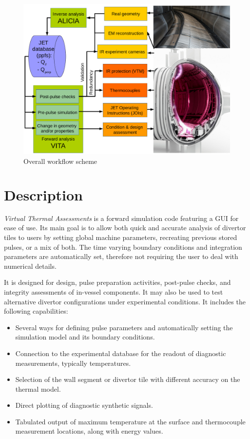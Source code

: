 \begin{figure}[htbp]
	\centering
	\includegraphics[width=0.90\linewidth]{images/scheme_software}
	\caption{Overall workflow scheme}
	\label{fig:scheme}
\end{figure}


\section{Description}
\textit{Virtual Thermal Assessments} is a forward simulation code featuring a GUI
for ease of use. Its main goal is to allow both quick and accurate analysis of divertor tiles to users by setting global machine parameters, recreating previous stored pulses, or a mix of both. The time varying boundary conditions and integration parameters are automatically set, therefore not requiring the user to deal with numerical details.

It is designed for design, pulse preparation activities, post-pulse checks, and integrity assessments of in-vessel components. It may also be used to test alternative divertor configurations under experimental conditions. It includes the following capabilities:
\begin{itemize}
	\item Several ways for defining pulse parameters and automatically setting the simulation model and its boundary conditions.
	\item Connection to the experimental database for the readout of diagnostic measurements, typically temperatures.
	\item Selection of the wall segment or divertor tile with different accuracy on the thermal model.
	\item Direct plotting of diagnostic synthetic signals.
	\item Tabulated output of maximum temperature at the surface and thermocouple measurement locations, along with energy values.
\end{itemize}

